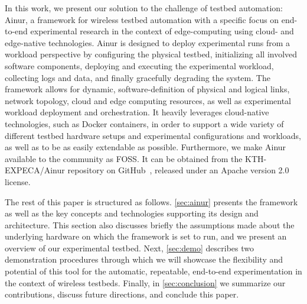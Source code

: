 In this work, we present our solution to the challenge of testbed automation: Ainur, a framework for wireless testbed automation with a specific focus on end-to-end experimental research in the context of edge-computing using cloud- and edge-native technologies.
Ainur is designed to deploy experimental runs from a workload perspective by configuring the physical testbed, initializing all involved software components, deploying and executing the experimental workload, collecting logs and data, and finally gracefully degrading the system.
The framework allows for dynamic, software-definition of physical and logical links, network topology, cloud and edge computing resources, as well as experimental workload deployment and orchestration.
It heavily leverages cloud-native technologies, such as Docker containers, in order to support a wide variety of different testbed hardware setups and experimental configurations and workloads, as well as to be as easily extendable as possible.
Furthermore, we make Ainur available to the community as \ac{FOSS}.
It can be obtained from the {KTH-EXPECA/Ainur} repository on GitHub~\cite{ainur:github}, released under an Apache version \num{2.0} license.

The rest of this paper is structured as follows.
\cref{sec:ainur} presents the framework as well as the key concepts and technologies supporting its design and architecture.
This section also discusses briefly the assumptions made about the underlying hardware on which the framework is set to run, and we present an overview of our experimental testbed.
Next, \cref{sec:demo} describes two demonstration procedures through which we will showcase the flexibility and potential of this tool for the automatic, repeatable, end-to-end experimentation in the context of wireless testbeds.
Finally, in \cref{sec:conclusion} we summarize our contributions, discuss future directions, and conclude this paper.

